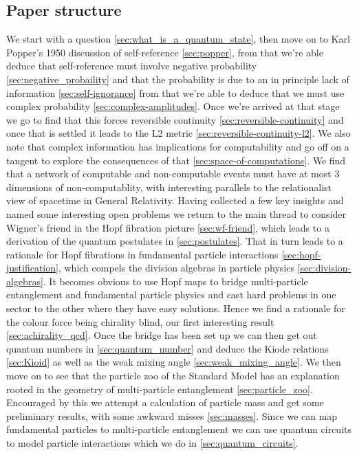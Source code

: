 \documentclass{article}
\theoremstyle{plain}
\theoremstyle{definition}
\theoremstyle{remark}\newtheorem*{remark}{Remark}
\begin{document}
\subsection{Paper structure}
We start with a question  \ref{sec:what_is_a_quantum_state}, then move on to Karl Popper's 1950 discussion of self-reference \ref{sec:popper}, from that we're able deduce that self-reference must involve negative probability \ref{sec:negative_probaility} and that the probability is due to an in principle lack of information \ref{sec:self-ignorance} from that we're able to deduce that we must use complex probability \ref{sec:complex-amplitudes}. Once we're arrived at that stage we go to find that this forces reversible continuity \ref{sec:reversible-continuity} and once that is settled it leads to the L2 metric \ref{sec:reversible-continuity-l2}. We also note that complex information has implications for computability and go off on a tangent to explore the consequences of that \ref{sec:space-of-computations}. We find that a network of computable and non-computable events must have at most 3 dimensions of non-computablity, with interesting parallels to the relationalist view of spacetime in General Relativity. Having collected a few key insights and named some interesting open problems we return to the main thread to consider Wigner's friend in the Hopf fibration picture \ref{sec:wf-friend}, which leads to a derivation of the quantum postulates in \ref{sec:postulates}. That in turn leads to a rationale for Hopf fibrations in fundamental particle interactions \ref{sec:hopf-justification}, which compels the division algebras in particle physics \ref{sec:division-algebras}. It becomes obvious to use Hopf maps to bridge multi-particle entanglement and fundamental particle physics and cast hard problems in one sector to the other where they have easy solutions. Hence we find a rationale for the colour force being chirality blind, our first interesting result \ref{sec:achirality_qcd}. Once the bridge has been set up we can then get out quantum numbers in \ref{sec:quantum_number} and deduce the Kiode relations \ref{sec:Kioid} as well as the weak mixing angle \ref{sec:weak_mixing_angle}. We then move on to see that the particle zoo of the Standard Model has an explanation rooted in the geometry of multi-particle entanglement \ref{sec:particle_zoo}. Encouraged by this we attempt a calculation of particle mass and get some preliminary results, with some awkward misses \ref{sec:masses}. Since we can map fundamental particles to multi-particle entanglement we can use quantum circuits to model particle interactions which we do in \ref{sec:quantum_circuits}. 
\end{document}
